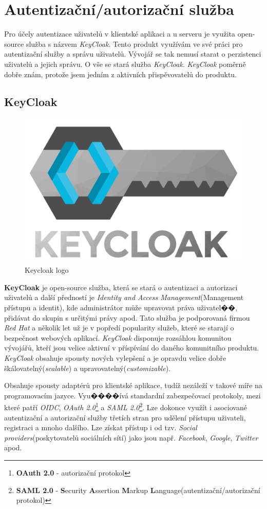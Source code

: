 \newpage
\section{Autentizační/autorizační služba}
\label{pouzite:auth}
Pro účely autentizace uživatelů v klientské aplikaci a u serveru je využita open-source služba s názvem \emph{KeyCloak}.
Tento produkt využívám ve své práci pro autentizační služby a správu uživatelů.
Vývojář se tak nemusí starat o perzistenci uživatelů a jejich správu.
O vše se stará služba \emph{KeyCloak}.
\emph{KeyCloak} poměrně dobře znám, protože jsem jedním z aktivních přispěvovatelů do produktu.

\subsection*{KeyCloak}
\label{terminy:keycloak}

\begin{figure}[hbt]
  \centering
  \includegraphics[width=.25 \linewidth]{obrazky-figures/keycloak2.png}
  \caption{Keycloak logo}
\end{figure}

\textbf{KeyCloak} je open-source služba, která se stará o autentizaci a autorizaci uživatelů a další předností je \emph{Identity and Access Management}(Management přístupu a identit), kde administrátor může upravovat práva uživatel��, přidávat do skupin s určitými právy apod.
Tato služba je podporovaná firmou \emph{Red Hat} a několik let už je v popředí popularity služeb, které se starají o bezpečnost webových aplikací. \emph{KeyCloak} disponuje rozsáhlou komunitou vývojářů, kteří jsou velice aktivní v příspívání do daného komunitního produktu.
\emph{KeyCloak} obsahuje spousty nových vylepšení a je opravdu velice dobře škálovatelný(\emph{scalable}) a upravovatelný(\emph{customizable}).

Obsahuje spousty adaptérů pro klientské aplikace, tudíž nezáleží v takové míře na programovacím jazyce.
Vyu����ívá standardní zabezpečovací protokoly, mezi které patří \emph{OIDC}, \emph{OAuth 2.0}\footnote{\textbf{OAuth 2.0} - autorizační protokol} a \emph{SAML 2.0}\footnote{\textbf{SAML 2.0} - \textbf{S}ecurity \textbf{A}ssertion \textbf{M}arkup \textbf{L}anguage(autentizační/autorizační protokol)}.
Lze dokonce využít i asociované autentizační a autorizační služby třetích stran pro udělení přístupu uživateli, registraci a mnoho dalšího. Lze získat přístup i od tzv. \emph{Social providers}(poskytovatelů sociálních sítí) jako jsou např. \emph{Facebook}, \emph{Google}, \emph{Twitter} apod.

